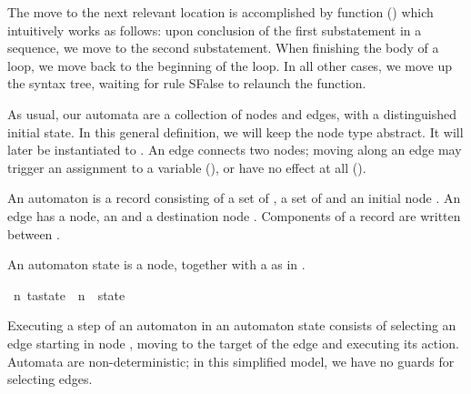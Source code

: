\begin{isabellebody}
\begin{isamarkuptext}
The move to the next relevant location is accomplished by function  () which intuitively works as follows: upon conclusion of the first substatement in
a sequence, we move to the second substatement. When finishing the body of a
loop, we move back to the beginning of the loop. In all other cases, we move
up the syntax tree, waiting for rule {\sc SFalse} to relaunch the
function.\end{isamarkuptext}\isamarkuptrue {}
\isamarkuptrue {}
\isamarkuptrue \begin{isamarkuptext}As usual, our automata are a collection of nodes and edges,
with a distinguished initial state. In this general definition, we will keep the node type  abstract. It will later be instantiated to .
An edge connects two nodes; moving along an edge may trigger an assignment to a
variable (), or have no effect at all ().

An automaton  is a record consisting of a set of , a set of  and an initial node . An edge has a  node, an  and a destination node . Components of a record are written between \isa{{\isasymlparr}\ {\isachardot}{\isachardot}{\isachardot}\ {\isasymrparr}}.\end{isamarkuptext}\isamarkuptrue {}
\isamarkuptrue \begin{isamarkuptext}An automaton state is a node, together with a  as in .\end{isamarkuptext}\isamarkuptrue {}\isamarkupfalse \ {\isacharprime}n\ ta{\isacharunderscore}state\ {\isacharequal}\ {\isachardoublequoteopen}{\isacharprime}n\ {\isacharasterisk}\ state{\isachardoublequoteclose}\begin{isamarkuptext}Executing a step of an automaton in an automaton state  consists of selecting an edge starting in node , moving to the
target of the edge and executing its action. Automata are
non-deterministic; in this simplified model, we have no guards for selecting
edges.


\end{isamarkuptext}
\end{isabellebody}

